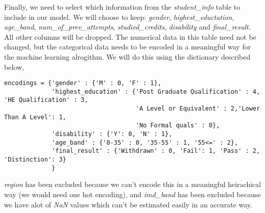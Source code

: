 \documentclass[8pt]{article}
\begin{document}
Finally, we need to select which information from the \textit{student\_info} table to include in our model. We will choose to keep: \textit{gender}, \textit{highest\_eductation}, \textit{age\_band}, \textit{num\_of\_prev\_attempts}, \textit{studied\_credits}, \textit{disability} and \textit{final\_result}. All other columns will be dropped. The numerical data in this table need not be changed, but the categorical data needs to be encoded in a meaningful way for the machine learning alrogithm. We will do this using the dictionary described below,
\newline
\newline
\begin{adjustbox}{max width=\textwidth}
\begin{lstlisting}
encodings = {'gender' : {'M' : 0, 'F' : 1},
             'highest_education' : {'Post Graduate Qualification' : 4, 'HE Qualification' : 3,
                                    'A Level or Equivalent' : 2,'Lower Than A Level': 1,
                                    'No Formal quals' : 0},
             'disability' : {'Y': 0, 'N' : 1},
             'age_band' : {'0-35' : 0, '35-55' : 1, '55<=' : 2},
             'final_result' : {'Withdrawn' : 0, 'Fail': 1, 'Pass' : 2, 'Distinction': 3}
             }
\end{lstlisting}
\end{adjustbox}
\newline
\newline
\textit{region} has been excluded because we can't encode this in a meaningful heirachical way (we would need one hot encoding), and \textit{imd\_band} has been excluded because we have alot of \textit{NaN} values which can't be estimated easily in an accurate way.
\end{document}
